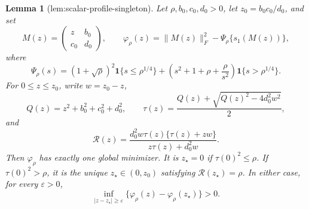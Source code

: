 \documentclass{article}
\newtheorem{lemma}{Lemma}
\begin{document}
\begin{lemma}[lem:scalar-profile-singleton]\label{lem:scalar-profile-singleton}
Let \(\rho,b_0,c_0,d_0>0\), let \(z_0=b_0c_0/d_0\), and set
\[
 M(z)=\begin{pmatrix}z&b_0\\ c_0&d_0\end{pmatrix},\qquad
 \varphi_\rho(z)=\|M(z)\|_F^2-\Psi_\rho\{s_1(M(z))\},
\]
where
\[
 \Psi_\rho(s)=(1+\sqrt\rho)^2\mathbf 1\{s\leq \rho^{1/4}\}
 +\left(s^2+1+\rho+\frac{\rho}{s^2}\right)\mathbf 1\{s>\rho^{1/4}\}.
\]
For \(0\leq z\leq z_0\), write \(w=z_0-z\),
\[
 Q(z)=z^2+b_0^2+c_0^2+d_0^2,\qquad
 \tau(z)=\frac{Q(z)+\sqrt{Q(z)^2-4d_0^2w^2}}{2},
\]
and
\[
 \mathcal R(z)=\frac{d_0^2w\tau(z)\{\tau(z)+zw\}}
 {z\tau(z)+d_0^2w}.
\]
Then \(\varphi_\rho\) has exactly one global minimizer.  It is \(z_\star=0\) if \(\tau(0)^2\leq\rho\).  If \(\tau(0)^2>\rho\), it is the unique \(z_\star\in(0,z_0)\) satisfying \(\mathcal R(z_\star)=\rho\).  In either case, for every \(\varepsilon>0\),
\[
 \inf_{|z-z_\star|\geq\varepsilon}
 \{\varphi_\rho(z)-\varphi_\rho(z_\star)\}>0.
\]
\end{lemma}
\end{document}

